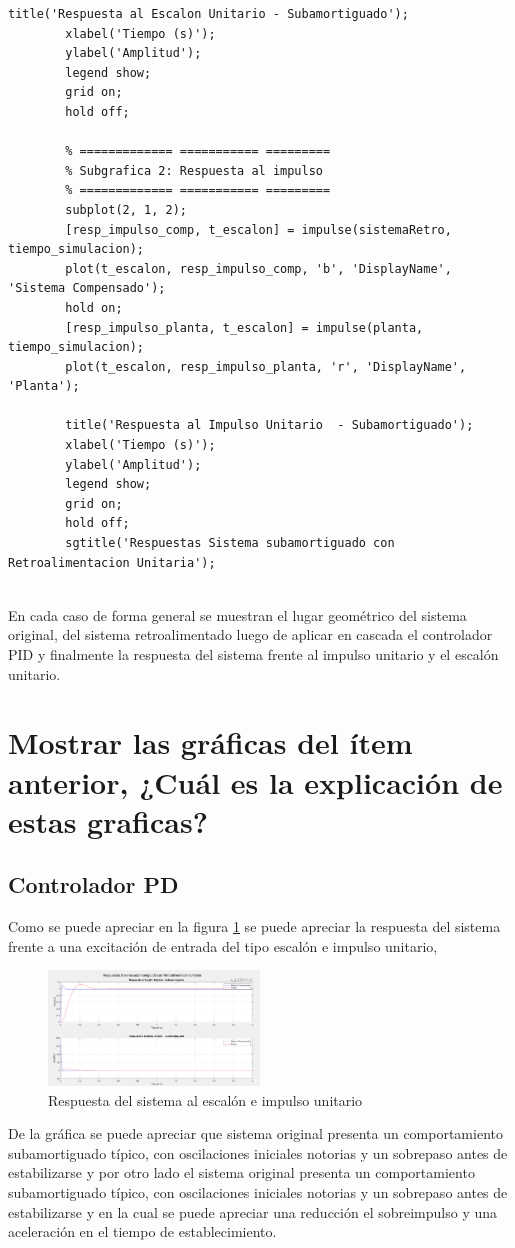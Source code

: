 \documentclass[conference]{IEEEtran}
\begin{document}
\begin{lstlisting}[numbers=none, caption={Controlador PID}]
		title('Respuesta al Escalon Unitario - Subamortiguado');
		xlabel('Tiempo (s)');
		ylabel('Amplitud');
		legend show;
		grid on; 
		hold off;
		
		% ============= =========== =========
		% Subgrafica 2: Respuesta al impulso
		% ============= =========== =========
		subplot(2, 1, 2); 
		[resp_impulso_comp, t_escalon] = impulse(sistemaRetro, tiempo_simulacion);
		plot(t_escalon, resp_impulso_comp, 'b', 'DisplayName', 'Sistema Compensado');
		hold on;
		[resp_impulso_planta, t_escalon] = impulse(planta, tiempo_simulacion);
		plot(t_escalon, resp_impulso_planta, 'r', 'DisplayName', 'Planta');
		
		title('Respuesta al Impulso Unitario  - Subamortiguado');
		xlabel('Tiempo (s)');
		ylabel('Amplitud'); 
		legend show;
		grid on; 
		hold off;
		sgtitle('Respuestas Sistema subamortiguado con Retroalimentacion Unitaria');
		
	\end{lstlisting}
	
	En cada caso de forma general se muestran el lugar geométrico del sistema original, del sistema retroalimentado luego de aplicar en cascada el controlador PID y finalmente la respuesta del sistema frente al impulso unitario y el escalón unitario.
	
	\section{Mostrar las gráficas del ítem anterior, ¿Cuál es la explicación de estas graficas?}
	\subsection{Controlador PD}
	Como se puede apreciar en la figura \ref{fig:respuesta-sistema} se puede apreciar la respuesta del sistema frente a una excitación de entrada del tipo escalón e impulso unitario, 
	
	\begin{figure}[h]
		\centering
		\includegraphics[width=0.5\textwidth]{media/respuesta-sistema.png}
		\caption{Respuesta del sistema al escalón e impulso unitario}
		\label{fig:respuesta-sistema}
	\end{figure}
	De la gráfica se puede apreciar que sistema original presenta un comportamiento subamortiguado típico, con oscilaciones iniciales notorias y un sobrepaso antes de estabilizarse y por otro lado el sistema original presenta un comportamiento subamortiguado típico, con oscilaciones iniciales notorias y un sobrepaso antes de estabilizarse y en la cual se puede apreciar una reducción el sobreimpulso y una aceleración en el tiempo de establecimiento.
	
\end{document}
